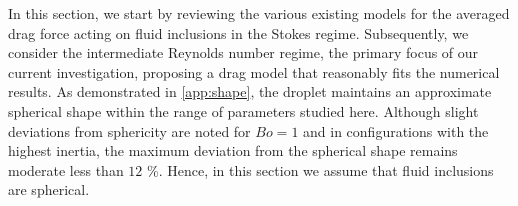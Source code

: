 








In this section, we start by reviewing the various existing models for the averaged drag force acting on fluid inclusions in the Stokes regime. Subsequently, we consider the intermediate Reynolds number regime, the primary focus of our current investigation, proposing a drag model that reasonably fits the numerical results. As demonstrated in \ref{app:shape}, the droplet maintains an approximate spherical shape within the range of parameters studied here. Although slight deviations from sphericity are noted for $Bo=1$ and in configurations with the highest inertia, the maximum deviation from the spherical shape remains moderate less than $12$ \%. Hence, in this section we assume that fluid inclusions are spherical.

